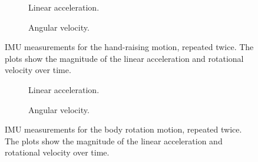 \documentclass[fleqn,10pt]{wlscirep}
\begin{document}
\begin{figure}[h!]
    \centering
    \begin{subfigure}{0.99\linewidth}
        \centering
        
        \vspace{-2.5 em}
        \caption{Linear acceleration.}
        \label{fig:imu_hand_linear}
    \end{subfigure}
    
    \begin{subfigure}{0.99\linewidth}
        \centering
        \vspace{1 em}
        
        \vspace{-2.5 em}
        \caption{Angular velocity.}
        \label{fig:imu_hand_angular}
    \end{subfigure}
    \caption{IMU measurements for the hand-raising motion, repeated twice. The plots show the magnitude of the linear acceleration and rotational velocity over time.}
    \label{fig:imu_hand_motion}
\end{figure}

\begin{figure}[h!]
    \centering
    \begin{subfigure}{0.99\linewidth}
        \centering
        
        \vspace{-2.5 em}
        \caption{Linear acceleration.}
        \label{fig:imu_body_linear}
    \end{subfigure}

    \begin{subfigure}{0.99\linewidth}
        \centering
        \vspace{1 em}
        
        \vspace{-2.5 em}
        \caption{Angular velocity.}
        \label{fig:imu_body_angular}
    \end{subfigure}
    \caption{IMU measurements for the body rotation motion, repeated twice. The plots show the magnitude of the linear acceleration and rotational velocity over time.}
    \label{fig:imu_body_rotation}
\end{figure}
\end{document}
